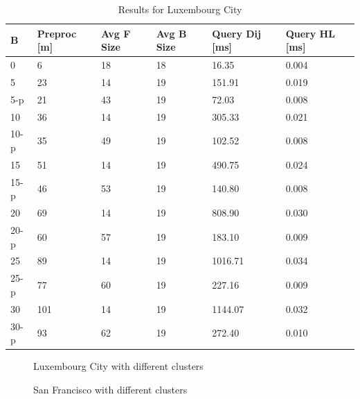 \begin{table}\caption{Results for Luxembourg City}\label{tab:lu4k_results}
\begin{center}
\begin{tabular}{ | l | p{1cm} | p{1cm} | p{1cm} | p{1.2cm} | p{1.2cm} |}
\hline
	B & Preproc  [m] & Avg F Size & Avg B Size & Query Dij [ms] & Query HL [ms] \\ \hline \hline
	0 & 6 & 18 & 18 & 16.35 & 0.004 \\ \hline
	5 & 23 & 14& 19 & 151.91 & 0.019 \\ 
	5-p & 21 & 43 &19 & 72.03 & 0.008 \\ \hline
	10 & 36 & 14 & 19 & 305.33 & 0.021 \\ 
10-p & 35 & 49 & 19 & 102.52 & 0.008 \\ \hline
	15 & 51 & 14& 19 & 490.75 & 0.024 \\ 
	15-p & 46 & 53 & 19 & 140.80 & 0.008 \\ \hline
	20 & 69 & 14 & 19 & 808.90 & 0.030 \\ 
	20-p & 60 & 57 & 19 & 183.10 & 0.009 \\ \hline
	25 & 89 & 14 & 19 & 1016.71 & 0.034 \\ 
	25-p & 77 & 60 & 19 & 227.16 & 0.009 \\ \hline
	30 & 101 & 14& 19 & 1144.07 & 0.032 \\ 
	30-p & 93 & 62 & 19 & 272.40 & 0.010 \\ \hline
\end{tabular}
\end{center}
\end{table}

\begin{figure}\caption{Luxembourg City with different clusters}\label{fig:clusters_lu}
\hfill

\end{figure}

\begin{figure}\caption{San Francisco with different clusters}\label{fig:clusters_sf}
\hfill

\end{figure}



